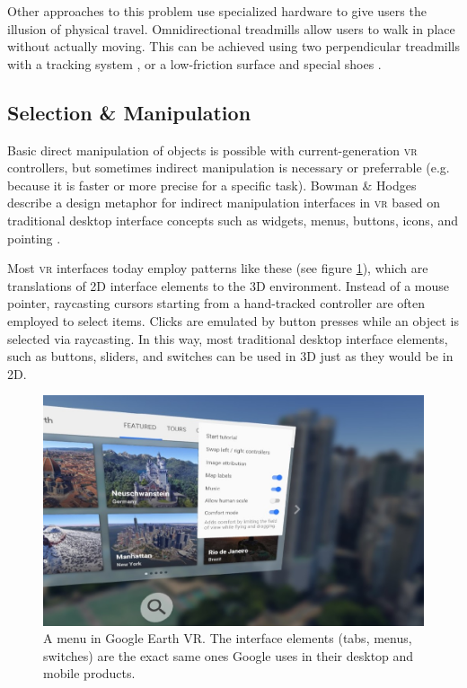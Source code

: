 \documentclass[nobib]{tufte-book} %
\begin{document}
Other approaches to this problem use specialized hardware to give users the illusion of physical travel. Omnidirectional treadmills allow users to walk in place without actually moving. This can be achieved using two perpendicular treadmills with a tracking system \cite[-3.3cm]{darken1997omni}, or a low-friction surface and special shoes \cite[-1cm]{warren2017omni}.

\subsection{Selection \& Manipulation}
Basic direct manipulation of objects is possible with current-generation \textsc{vr} controllers, but sometimes indirect manipulation is necessary or preferrable (e.g. because it is faster or more precise for a specific task). Bowman \& Hodges describe a design metaphor for indirect manipulation interfaces in \textsc{vr}  based on traditional desktop interface concepts such as widgets, menus, buttons, icons, and pointing \cite{bowman1994wimp}.

Most \textsc{vr} interfaces today employ patterns like these (see figure \ref{fig:earth-menu}), which are translations of 2D interface elements to the 3D environment. Instead of a mouse pointer, raycasting cursors starting from a hand-tracked controller are often employed to select items. Clicks are emulated by button presses while an object is selected via raycasting. In this way, most traditional desktop interface elements, such as buttons, sliders, and switches can be used in 3D just as they would be in 2D.

\begin{figure}
  \includegraphics{earth-menu.png}
  \caption{A menu in Google Earth VR. The interface elements (tabs, menus, switches) are the exact same ones Google uses in their desktop and mobile products.}
  \label{fig:earth-menu}
\end{figure}
\end{document}
